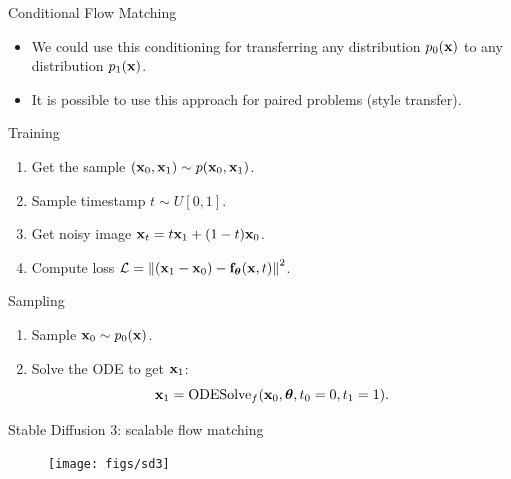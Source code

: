 \begin{frame}{Conditional Flow Matching}
	\begin{itemize}
		\item We could use this conditioning for transferring any distribution $p_0(\mathbf{x})$ to any distribution $p_1(\mathbf{x})$.
		\item It is possible to use this approach for paired problems (style transfer).
	\end{itemize}
	\begin{block}{Training}
		\begin{enumerate}
			\item Get the sample $(\mathbf{x}_0, \mathbf{x}_1) \sim p(\mathbf{x}_0, \mathbf{x}_1)$.
						\item Sample timestamp $t \sim U[0, 1]$.
						\item Get noisy image $\mathbf{x}_t = t \mathbf{x}_1 + (1 - t) \mathbf{x}_0$.
			\item Compute loss $ \mathcal{L} = \left\| (\mathbf{x}_1 - \mathbf{x}_0) - \mathbf{f}_{\boldsymbol{\theta}}(\mathbf{x}, t) \right\|^2 $.
		\end{enumerate}
	\end{block}
	\vspace{-0.3cm}
	\begin{block}{Sampling}
		\begin{enumerate}
			\item Sample $\mathbf{x}_0 \sim p_0(\mathbf{x})$.
			\item Solve the ODE to get $\mathbf{x}_1$:
			\[
				\mathbf{x}_1 = \text{ODESolve}_f(\mathbf{x}_0, \boldsymbol{\theta}, t_0=0, t_1=1).
			\]
		\end{enumerate}
	\end{block}
\end{frame}
\begin{frame}{Stable Diffusion 3: scalable flow matching}
	\begin{figure}
		\centering
		\texttt{[image: figs/sd3]}
	\end{figure}
\end{frame}
